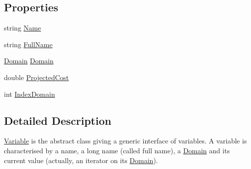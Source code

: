 \subsection*{Properties}
\begin{DoxyCompactItemize}
\item 
string \hyperlink{classghost_1_1Variable_a1dba3848c7675d086eecad078178e4d9}{Name}
\item 
string \hyperlink{classghost_1_1Variable_af20c2f01306cba69f36d32babb703c1d}{Full\-Name}
\item 
\hyperlink{classghost_1_1Domain}{Domain} \hyperlink{classghost_1_1Variable_aae96e8a30ff2f44dc115a0b51e136e92}{Domain}
\item 
double \hyperlink{classghost_1_1Variable_a7c5bc50b854d25917ef641a2e965ea2a}{Projected\-Cost}
\item 
int \hyperlink{classghost_1_1Variable_a4fa08b5d46a4559d345d4752e7a790d2}{Index\-Domain}
\end{DoxyCompactItemize}


\subsection{Detailed Description}
\hyperlink{classghost_1_1Variable}{Variable} is the abstract class giving a generic interface of variables. A variable is characterised by a name, a long name (called full name), a \hyperlink{classghost_1_1Domain}{Domain} and its current value (actually, an iterator on its \hyperlink{classghost_1_1Domain}{Domain}). 

